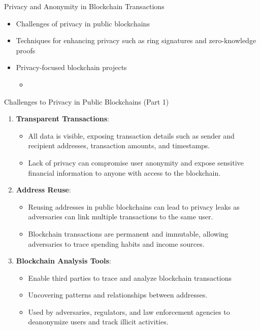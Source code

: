 \begin{withoutheadline}
\begin{frame}{Privacy and Anonymity in Blockchain Transactions}
    \begin{itemize}
        \item Challenges of privacy in public blockchains
        \item Techniques for enhancing privacy such as ring signatures and zero-knowledge proofs
        \item Privacy-focused blockchain projects
        \begin{itemize}
            \item 
        \end{itemize}
    \end{itemize}
\end{frame}

\begin{frame}{Challenges to Privacy in Public Blockchains (Part 1)}
    \begin{enumerate}
        \item \textbf{Transparent Transactions}:
            \begin{itemize}
                \item All data is visible, exposing transaction details such as sender and recipient addresses, transaction amounts, and timestamps.
                \item Lack of privacy can compromise user anonymity and expose sensitive financial information to anyone with access to the blockchain.
            \end{itemize}
        
        \item \textbf{Address Reuse}:
            \begin{itemize}
                \item Reusing addresses in public blockchains can lead to privacy leaks as adversaries can link multiple transactions to the same user.
                \item Blockchain transactions are permanent and immutable, allowing adversaries to trace spending habits and income sources.
            \end{itemize}
        
        \item \textbf{Blockchain Analysis Tools}:
            \begin{itemize}
                \item Enable third parties to trace and analyze blockchain transactions
                \item Uncovering patterns and relationships between addresses.
                \item Used by adversaries, regulators, and law enforcement agencies to deanonymize users and track illicit activities.
            \end{itemize}
    \end{enumerate}
\end{frame}


\end{withoutheadline}
